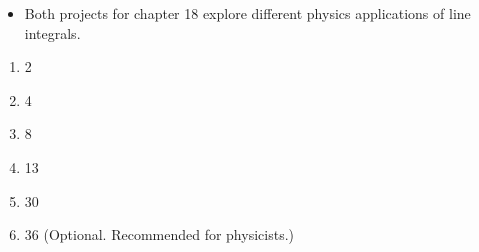 \documentclass[12pt]{article}
\begin{document}
\begin{itemize}
  \item Both projects for chapter 18 explore different physics
    applications of line integrals.  
\end{itemize}

\begin{enumerate}
\setlength{\itemsep}{-1mm}
  \item 2
  \item 4
  \item 8
  \item 13
  \item 30
  \item 36 (Optional.  Recommended for physicists.)
\end{enumerate}
\end{document}
